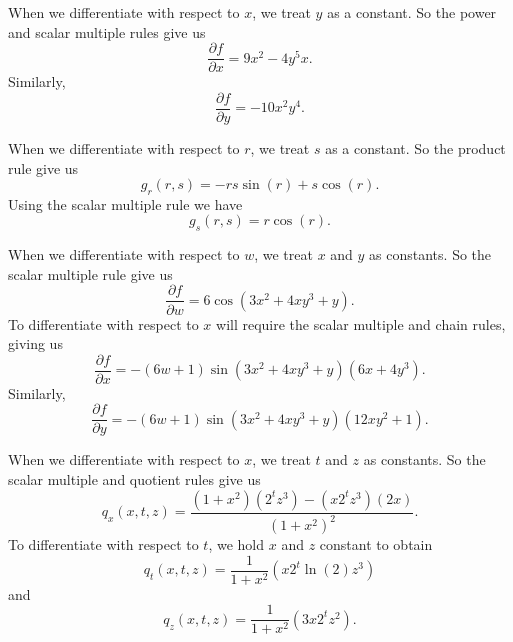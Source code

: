 \begin{activitySolution}
	\ba
	\item When we differentiate with respect to $x$, we treat $y$ as a constant. So the power and scalar multiple rules give us
\[\frac{\partial f}{\partial x} = 9x^2 - 4y^5x.\]
Similarly,
\[\frac{\partial f}{\partial y} = -10x^2y^4.\]
		
	
	\item When we differentiate with respect to $r$, we treat $s$ as a constant. So the product rule give us 
\[g_r(r,s) = -rs\sin(r) + s\cos(r).\]
Using the scalar multiple rule we have
\[g_s(r,s) = r\cos(r).\]
		
	\item When we differentiate with respect to $w$, we treat $x$ and $y$ as constants. So the scalar multiple rule give us 
\[\frac{\partial f}{\partial w} = 6\cos(3x^2+4xy^3+y).\]
To differentiate with respect to $x$ will require the scalar multiple and chain rules, giving us
\[\frac{\partial f}{\partial x} = -(6w+1)\sin(3x^2+4xy^3+y)(6x+4y^3).\]
Similarly,
\[\frac{\partial f}{\partial y} = -(6w+1)\sin(3x^2+4xy^3+y)(12xy^2+1).\]	
		
	\item When we differentiate with respect to $x$, we treat $t$ and $z$ as constants. So the scalar multiple and quotient rules give us 
\[q_x(x,t,z) = \frac{(1+x^2)(2^tz^3)-(x2^tz^3)(2x)}{(1+x^2)^2}.\]
To differentiate with respect to $t$, we hold $x$ and $z$ constant to obtain
\[q_t(x,t,z) = \frac{1}{1+x^2}(x2^t\ln(2)z^3)\]
and
\[q_z(x,t,z) = \frac{1}{1+x^2}(3x2^tz^2).\]
		
	\ea

\end{activitySolution}
\aftera

